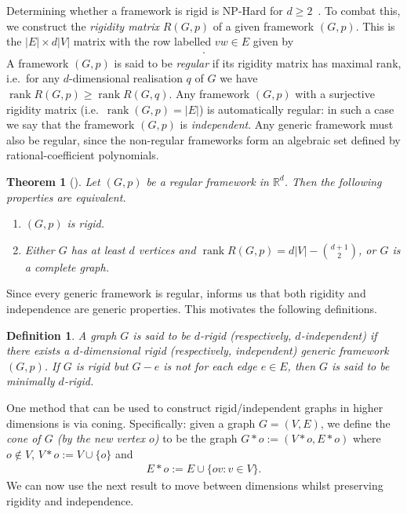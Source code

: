 \documentclass[11pt]{article}
\newtheorem{definition}[theo]{Definition}
\newtheorem{theorem}[theo]{Theorem}
\theoremstyle{definition}
\providecommand{\ie}{i.e.\ }
\numberwithin{equation}{section}
\DeclareMathOperator{\rank}{rank}
\begin{document}
Determining whether a framework is rigid is NP-Hard for $d \geq 2$~\cite{Abbot}.
To combat this, we construct the \emph{rigidity matrix} $R(G,p)$ of a given framework $(G,p)$.
This is the $|E| \times d|V|$ matrix with the row labelled $vw \in E$ given by
\begin{align*}
	[ 0 \quad \cdots  \quad 0  \quad \overbrace{p_v-p_w}^{v} \quad 0  \quad \cdots  \quad 0  \quad \overbrace{p_w-p_v}^{w} \quad 0  \quad \cdots  \quad 0].
\end{align*}
A framework $(G,p)$ is said to be \emph{regular} if its rigidity matrix has maximal rank,
\ie for any $d$-dimensional realisation $q$ of $G$ we have $\rank R(G,p) \geq \rank R(G,q)$.
Any framework $(G,p)$ with a surjective rigidity matrix (\ie $\rank (G,p)=|E|$) is automatically regular:
in such a case we say that the framework $(G,p)$ is \emph{independent}.
Any generic framework must also be regular, since the non-regular frameworks form an algebraic set defined by rational-coefficient polynomials.


\begin{theorem}[\cite{AsimowRothI}]\label{t:asimowroth}
	Let $(G,p)$ be a regular framework in $\mathbb{R}^d$.
	Then the following properties are equivalent.
	\begin{enumerate}
		\item \label{t:asimowroth1} $(G,p)$ is rigid.
		\item \label{t:asimowroth2} Either $G$ has at least $d$ vertices and $\rank R(G,p) = d|V| - \binom{d+1}{2}$, or $G$ is a complete graph.
	\end{enumerate}
\end{theorem}

Since every generic framework is regular,
 informs us that both rigidity and independence are generic properties.
This motivates the following definitions.

\begin{definition}
	A graph $G$ is said to be \emph{$d$-rigid} (respectively, $d$-independent) if there exists a $d$-dimensional rigid (respectively, independent) generic framework $(G,p)$.
	If $G$ is rigid but $G-e$ is not for each edge $e \in E$,
	then $G$ is said to be \emph{minimally $d$-rigid}.
\end{definition}

One method that can be used to construct rigid/independent graphs in higher dimensions is via coning.
Specifically:
given a graph $G=(V,E)$,
we define the \emph{cone of $G$ (by the new vertex $o$)} to be the graph $G*o := (V*o, E*o)$ where $o \notin V$, $V*o := V \cup \{o\}$ and 
\begin{align*}
	E*o := E \cup \{ o v : v \in V\}.
\end{align*}
We can now use the next result to move between dimensions whilst preserving rigidity and independence.
\end{document}
